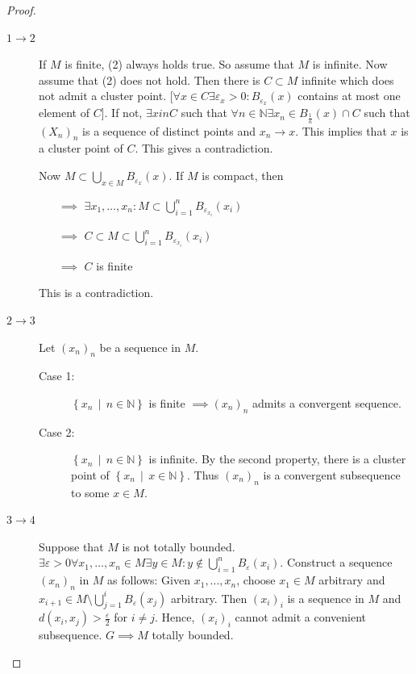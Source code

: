 \documentclass[a4paper]{article}
\numberwithin{lecref}{section}
\newcommand{\SetDef}[2]{\left\{#1\,\mid\,#2\right\}}
\begin{document}
\begin{proof}
	\begin{description}
		\item[$1 \to 2$]
			If $M$ is finite, (2) always holds true.
			So assume that $M$ is infinite. Now assume that (2) does not hold.
			Then there is $C \subset M$ infinite which does not admit a cluster point.
			[$\forall x \in C \exists \varepsilon_x > 0: B_{\varepsilon_x}(x)$ contains at most one element of $C$].
			If not, $\exists x in C$ such that $\forall n \in \mathbb N \exists x_n \in B_{\frac1n}(x) \cap C$ such that $(X_n)_n$ is a sequence of distinct points and $x_n \to x$.
			This implies that $x$ is a cluster point of $C$. This gives a contradiction.

			Now $M \subset \bigcup_{x \in M} B_{\varepsilon_x}(x)$. If $M$ is compact, then
			\begin{enumerate}
				\item[$\implies$] $\exists x_1, \dots, x_n: M \subset \bigcup_{i=1}^n B_{\varepsilon_{x_i}}(x_i)$
				\item[$\implies$] $C \subset M \subset \bigcup_{i=1}^n B_{\varepsilon_{x_i}}(x_i)$
				\item[$\implies$] $C$ is finite
			\end{enumerate}
			This is a contradiction.
		\item[$2 \to 3$]
			Let $(x_n)_n$ be a sequence in $M$.
			\begin{description}
				\item[Case 1:]
					$\SetDef{x_n}{n \in \mathbb N}$ is finite $\implies (x_n)_n$ admits a convergent sequence.
				\item[Case 2:]
					$\SetDef{x_n}{n \in \mathbb N}$ is infinite.
					By the second property, there is a cluster point of $\SetDef{x_n}{x \in \mathbb N}$.
					Thus $(x_n)_n$ is a convergent subsequence to some $x \in M$.
			\end{description}
		\item[$3 \to 4$]
			Suppose that $M$ is not totally bounded. $\exists \varepsilon > 0 \forall x_1, \dots, x_n \in M \exists y \in M: y \not\in \bigcup_{i = 1}^n B_{\varepsilon}(x_i)$.
			Construct a sequence $(x_n)_n$ in $M$ as follows:
			Given $x_1, \dots, x_n$, choose $x_1 \in M$ arbitrary and $x_{i+1} \in M \setminus \bigcup_{j=1}^i B_{\varepsilon}(x_j)$ arbitrary.
			Then $(x_i)_i$ is a sequence in $M$ and $d(x_i, x_j) > \frac\varepsilon2$ for $i \neq j$.
			Hence, $(x_i)_i$ cannot admit a convenient subsequence. $G \implies M$ totally bounded.


\end{description}
\end{proof}
\end{document}
